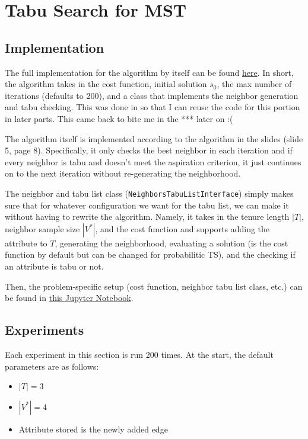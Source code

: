 \section{Tabu Search for MST}

\subsection{Implementation}

The full implementation for the algorithm by itself can be found \href{https://github.com/nngerncham/ma395_heuristic/blob/main/homework/hw3/codebase/tabu_search/algorithm.py}{here}. In short, the algorithm takes in the cost function, initial solution \(s_0\), the max number of iterations (defaults to 200), and a class that implements the neighbor generation and tabu checking. This was done in so that I can reuse the code for this portion in later parts. This came back to bite me in the *** later on :(

The algorithm itself is implemented according to the algorithm in the slides (slide 5, page 8). Specifically, it only checks the best neighbor in each iteration and if every neighbor is tabu and doesn't meet the aspiration criterion, it just continues on to the next iteration without re-generating the neighborhood.

The neighbor and tabu list class (\texttt{NeighborsTabuListInterface}) simply makes sure that for whatever configuration we want for the tabu list, we can make it without having to rewrite the algorithm. Namely, it takes in the tenure length \(|T|\), neighbor sample size \(|V^*|\), and the cost function and supports adding the attribute to \(T\), generating the neighborhood, evaluating a solution (is the cost function by default but can be changed for probabilitic TS), and the checking if an attribute is tabu or not.

Then, the problem-specific setup (cost function, neighbor tabu list class, etc.) can be found in \href{https://github.com/nngerncham/ma395_heuristic/blob/main/homework/hw3/codebase/Notebooks/Problem\%201.ipynb}{this Jupyter Notebook}.

\subsection{Experiments}

Each experiment in this section is run 200 times. At the start, the default parameters are as follows:
\begin{itemize}
    \item \(|T| = 3\)
    \item \(|V^*| = 4\)
    \item Attribute stored is the newly added edge
\end{itemize}

